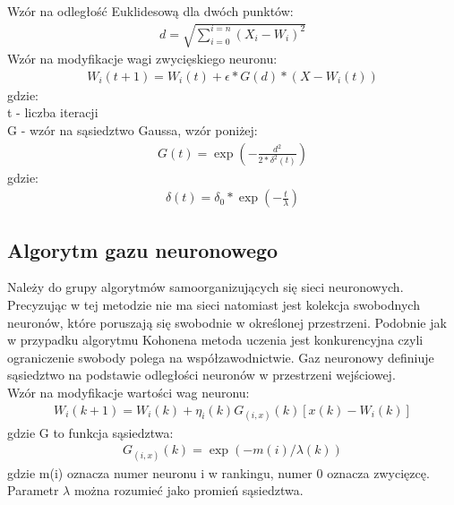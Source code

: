 \documentclass{classrep}
\begin{document}
{{            Wzór na odległość Euklidesową dla dwóch punktów:
            \begin{align*}
                d=\displaystyle\sqrt{\sum_{i=0}^{i=n} {(X_i - W_i)^2}}
            \end{align*}
            Wzór na modyfikacje wagi zwycięskiego neuronu:
            \begin{align*}
                W_i(t + 1) = W_i(t) + \epsilon * G(d)* (X - W_i(t))
            \end{align*}
            gdzie:\\
            t - liczba iteracji\\
            G - wzór na sąsiedztwo Gaussa, wzór poniżej:
            \begin{align*}
                G(t) = \exp (-\frac{d^2} {2* \delta^2(t)})
            \end{align*}
            gdzie:
            \begin{align*}
                \delta(t) = \delta_0 * \exp (-\frac {t} { \lambda })
            \end{align*}
        }


        \subsection{Algorytm gazu neuronowego}
        {
            Należy do grupy algorytmów samoorganizujących się sieci neuronowych. Precyzując w tej metodzie nie ma sieci natomiast
            jest kolekcja swobodnych neuronów, które poruszają się swobodnie w określonej przestrzeni. Podobnie jak w przypadku
            algorytmu Kohonena metoda uczenia jest konkurencyjna czyli ograniczenie swobody polega na współzawodnictwie.
            Gaz neuronowy definiuje sąsiedztwo na podstawie odległości neuronów w przestrzeni wejściowej. \\

            Wzór na modyfikacje wartości wag neuronu:
            \begin{align*}
                W_i(k+1)=W_i(k)+\eta_i(k)G_{(i,x)}(k)[x(k)-W_i(k)]
            \end{align*}
            gdzie G to funkcja sąsiedztwa:
            \begin{align*}
                G_{(i,x)}(k)=\exp(-m(i)/\lambda(k))
            \end{align*}
            gdzie m(i) oznacza numer neuronu i w rankingu, numer 0 oznacza zwycięzcę.\\
            Parametr $\lambda$ można rozumieć jako promień sąsiedztwa.
        }
    }
\end{document}
